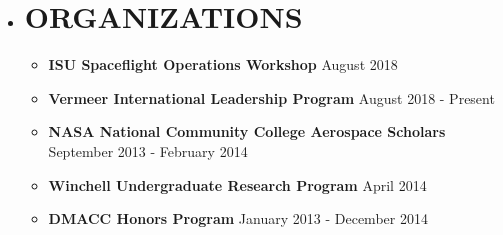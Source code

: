 \documentclass[overlapped, 11pt]{res}
\begin{document}
\begin{resume}
\begin{itemize}
    \item[]\section{ORGANIZATIONS}
    
        \begin{itemize}
            \item[] \textbf{ISU Spaceflight Operations Workshop}
                \hfill August 2018
            \item[] \textbf{Vermeer International Leadership Program}
                \hfill August 2018 - Present
            \item[] \textbf{NASA National Community College Aerospace Scholars}
                \hfill September 2013 - February 2014
            \item[] \textbf{Winchell Undergraduate Research Program}
                \hfill April 2014
            \item[] \textbf{DMACC Honors Program}
                \hfill January 2013 - December 2014
        \end{itemize}

    \end{itemize}
    \end{resume}
\end{document}
